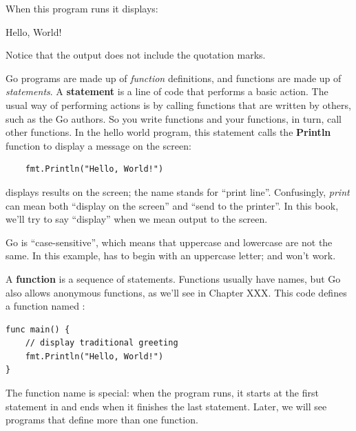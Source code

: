 When this program runs it displays:

\begin{stdout}
Hello, World!
\end{stdout}

Notice that the output does not include the quotation marks.



Go programs are made up of {\em function} definitions, and functions are made up of {\em statements}.
A {\bf statement} is a line of code that performs a basic action.
The usual way of performing actions is by calling functions that are written by others, such as the Go authors.
So you write functions and your functions, in turn, call other functions.
In the hello world program, this statement calls the {\bf Println} function to display a message on the screen:

\begin{lstlisting}
	fmt.Println("Hello, World!")
\end{lstlisting}


 displays results on the screen; the name  stands for ``print line''.
Confusingly, {\em print} can mean both ``display on the screen'' and ``send to the printer''.
In this book, we'll try to say ``display'' when we mean output to the screen.


Go is ``case-sensitive'', which means that uppercase and lowercase are not the same.
In this example,  has to begin with an uppercase letter;  and  won't work.


A {\bf function} is a sequence of statements.
Functions usually have names, but Go also allows anonymous functions, as we'll see in Chapter XXX.
This code defines a function named :

\begin{lstlisting}
func main() {
	// display traditional greeting
	fmt.Println("Hello, World!")
}
\end{lstlisting}


The function name  is special: when the program runs,
it starts at the first statement in  and ends when it finishes the last statement.
Later, we will see programs that define more than one function.

